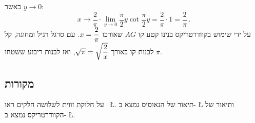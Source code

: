 כאשר
$y\rightarrow 0$:
\[
x \rightarrow \frac{2}{\pi}\cdot \lim_{y\rightarrow 0}\frac{\pi}{2}y\cot \frac{\pi}{2}y = \frac{2}{\pi}\cdot 1 = \frac{2}{\pi}\,.
\]
על ידי שימוש בקוודרטריקס בנינו קטע קו
$\overline{AG}$
שאורכו
$x=\displaystyle\frac{2}{\pi}$.
עם סרגל רגיל ומחוגה, קל לבנות קו באורך
$\sqrt{\pi}=\sqrt{\displaystyle\frac{2}{x}}$,
ואז לבנות ריבוע ששטחו
$\pi$.

\subsection*{מקורות}


על חלוקת זווית לשלושה חלקים ראו~%
\L{\cite{angle-trisection}}.
תיאור של הנאוסיס נמצא ב-%
\L{\cite{neusis-construction}}
ותיאור של הקוודרטריקס נמצא ב-%
\L{\cite{quadratrix}}.
